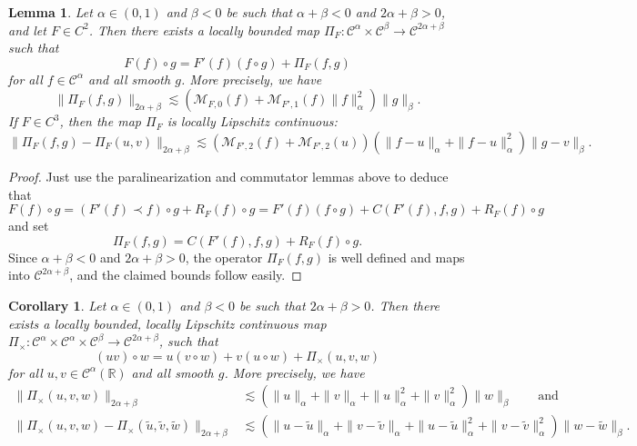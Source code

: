 \documentclass[11pt,a4paper]{article}
\newtheorem{corollary}[theorem]{Corollary}
\newtheorem{lemma}[theorem]{Lemma}
\theoremstyle{remark}
\newcommand{\CC}{\ensuremath{\mathscr{C}}}
\begin{document}
\begin{lemma}\label{lemma:para-taylor}
  Let $\alpha \in ( 0,1 )$ and $\beta <0$ be such
  that $\alpha + \beta <0$ and $2 \alpha + \beta >0$, and let $F \in C^{2}$.
  Then there exists a locally bounded map $\Pi_{F} \colon \CC^{\alpha} \times \CC^{\beta} \rightarrow \CC^{2 \alpha + \beta}$ such that
  \begin{equation}\label{eq:para-taylor}
      F ( f ) \circ g=F' ( f ) ( f \circ g ) + \Pi_{F} ( f,g )
  \end{equation}
  for all $f \in \CC^{\alpha}$ and all smooth $g$. More precisely, we have
  \[
     \| \Pi_{F} ( f,g ) \|_{2 \alpha + \beta} \lesssim (\mathcal{M}_{F,0} ( f ) +\mathcal{M}_{F' ,1} ( f ) \| f \|_{\alpha}^{2} ) \| g \|_{\beta}.
  \]
  If $F \in C^{3}$, then the map $\Pi_{F}$ is locally Lipschitz continuous:
  \[
     \| \Pi_{F} ( f,g ) - \Pi_{F} ( u,v ) \|_{2 \alpha + \beta} \lesssim (\mathcal{M}_{F' ,2} ( f ) +\mathcal{M}_{F' ,2} ( u ) ) ( \| f-u \|_{\alpha} + \| f-u \|_{\alpha}^{2} ) \| g-v \|_{\beta}.
  \]
\end{lemma}

\begin{proof}
  Just use the paralinearization and commutator lemmas above to deduce that
  \[
     F ( f ) \circ g= ( F' ( f ) \prec f ) \circ g+R_{F} ( f ) \circ g=F' ( f ) ( f \circ g ) +C ( F' ( f ) ,f,g ) +R_{F} ( f ) \circ g
  \]
  and set
  \[
     \Pi_{F} ( f,g ) =C ( F' ( f ) ,f,g ) +R_{F} ( f ) \circ g.
  \]
  Since $\alpha + \beta < 0$ and $2 \alpha + \beta >0$, the operator $\Pi_{F} ( f,g )$ is well defined
  and maps into $\CC^{2 \alpha + \beta}$, and the claimed bounds follow
  easily.
\end{proof}

\begin{corollary}\label{cor:para-taylor product}
  Let $\alpha \in ( 0,1 )$ and $\beta <0$ be such that $2 \alpha + \beta >0$.
  Then there exists a locally bounded, locally Lipschitz continuous map
  $\Pi_{\times} \colon \CC^{\alpha} \times \CC^{\alpha} \times \CC^{\beta} \rightarrow \CC^{2 \alpha + \beta}$, such that
  \[
     ( u v ) \circ w=u ( v \circ w ) +v ( u \circ w ) + \Pi_{\times} ( u,v,w )
  \]
  for all $u,v \in \CC^{\alpha} ( \mathbb{R} )$ and all smooth $g$. More
  precisely, we have
  \begin{align*}
     \| \Pi_{\times} ( u,v,w ) \|_{2 \alpha + \beta} &\lesssim ( \| u \|_{\alpha} + \| v \|_{\alpha} + \| u \|_{\alpha}^{2} + \| v \|_{\alpha}^{2} ) \| w \|_{\beta} \qquad \text{and} \\
     \| \Pi_{\times} ( u,v,w ) - \Pi_{\times} ( \tilde{u} , \tilde{v} ,  \tilde{w} ) \|_{2 \alpha + \beta} & \lesssim ( \| u- \tilde{u} \|_{\alpha} + \| v- \tilde{v} \|_{\alpha} + \| u- \tilde{u} \|_{\alpha}^{2} + \| v-     \tilde{v} \|_{\alpha}^{2} ) \| w- \tilde{w} \|_{\beta} .
  \end{align*}
\end{corollary}
\end{document}

